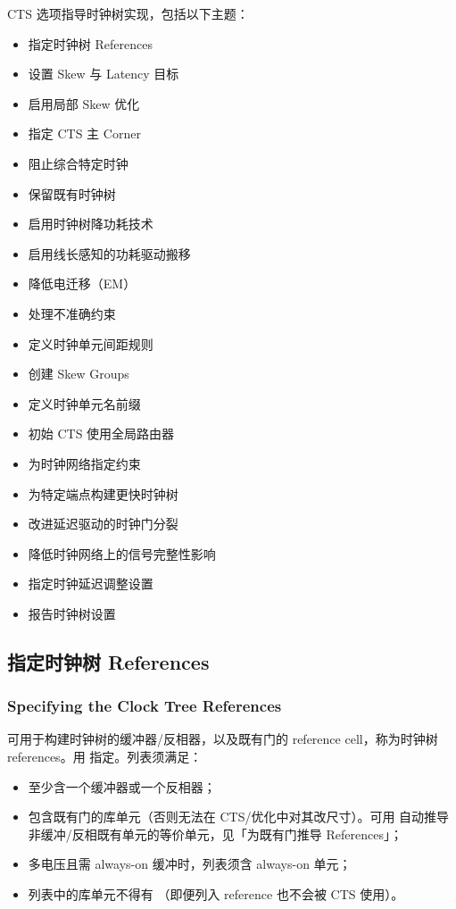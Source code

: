 CTS 选项指导时钟树实现，包括以下主题：
\begin{itemize}
  \item 指定时钟树 References
  \item 设置 Skew 与 Latency 目标
  \item 启用局部 Skew 优化
  \item 指定 CTS 主 Corner
  \item 阻止综合特定时钟
  \item 保留既有时钟树
  \item 启用时钟树降功耗技术
  \item 启用线长感知的功耗驱动搬移
  \item 降低电迁移（EM）
  \item 处理不准确约束
  \item 定义时钟单元间距规则
  \item 创建 Skew Groups
  \item 定义时钟单元名前缀
  \item 初始 CTS 使用全局路由器
  \item 为时钟网络指定约束
  \item 为特定端点构建更快时钟树
  \item 改进延迟驱动的时钟门分裂
  \item 降低时钟网络上的信号完整性影响
  \item 指定时钟延迟调整设置
  \item 报告时钟树设置
\end{itemize}

\subsection{指定时钟树 References}
\subsubsection*{Specifying the Clock Tree References}

可用于构建时钟树的缓冲器/反相器，以及既有门的 reference cell，称为时钟树 references。用  指定。列表须满足：
\begin{itemize}
  \item 至少含一个缓冲器或一个反相器；
  \item 包含既有门的库单元（否则无法在 CTS/优化中对其改尺寸）。可用  自动推导非缓冲/反相既有单元的等价单元，见「为既有门推导 References」；
  \item 多电压且需 always-on 缓冲时，列表须含 always-on 单元；
  \item 列表中的库单元不得有 （即便列入 reference 也不会被 CTS 使用）。
\end{itemize}

